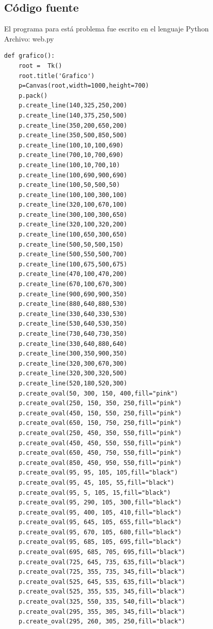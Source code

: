 \documentclass[12pt]{article}
\begin{document}
\subsection{Código fuente}
El programa para está problema fue escrito en el lenguaje Python\\

Archivo: web.py
\lstset{language=C, breaklines=true, basicstyle=\footnotesize}
\begin{lstlisting}[frame=single]
def grafico():
	root = 	Tk()
	root.title('Grafico')
	p=Canvas(root,width=1000,height=700)
	p.pack()
	p.create_line(140,325,250,200)
	p.create_line(140,375,250,500)
	p.create_line(350,200,650,200)
	p.create_line(350,500,850,500)
	p.create_line(100,10,100,690)
	p.create_line(700,10,700,690)
	p.create_line(100,10,700,10)
	p.create_line(100,690,900,690)
	p.create_line(100,50,500,50)
	p.create_line(100,100,300,100)
	p.create_line(320,100,670,100)
	p.create_line(300,100,300,650)
	p.create_line(320,100,320,200)
	p.create_line(100,650,300,650)
	p.create_line(500,50,500,150)
	p.create_line(500,550,500,700)
	p.create_line(100,675,500,675)
	p.create_line(470,100,470,200)
	p.create_line(670,100,670,300)
	p.create_line(900,690,900,350)
	p.create_line(880,640,880,530)
	p.create_line(330,640,330,530)
	p.create_line(530,640,530,350)
	p.create_line(730,640,730,350)
	p.create_line(330,640,880,640)
	p.create_line(300,350,900,350)
	p.create_line(320,300,670,300)
	p.create_line(320,300,320,500)
	p.create_line(520,180,520,300)
	p.create_oval(50, 300, 150, 400,fill="pink")
	p.create_oval(250, 150, 350, 250,fill="pink")
	p.create_oval(450, 150, 550, 250,fill="pink")
	p.create_oval(650, 150, 750, 250,fill="pink")
	p.create_oval(250, 450, 350, 550,fill="pink")
	p.create_oval(450, 450, 550, 550,fill="pink")
	p.create_oval(650, 450, 750, 550,fill="pink")
	p.create_oval(850, 450, 950, 550,fill="pink")
	p.create_oval(95, 95, 105, 105,fill="black")
	p.create_oval(95, 45, 105, 55,fill="black")
	p.create_oval(95, 5, 105, 15,fill="black")
	p.create_oval(95, 290, 105, 300,fill="black")
	p.create_oval(95, 400, 105, 410,fill="black")
	p.create_oval(95, 645, 105, 655,fill="black")
	p.create_oval(95, 670, 105, 680,fill="black")
	p.create_oval(95, 685, 105, 695,fill="black")
	p.create_oval(695, 685, 705, 695,fill="black")
	p.create_oval(725, 645, 735, 635,fill="black")
	p.create_oval(725, 355, 735, 345,fill="black")
	p.create_oval(525, 645, 535, 635,fill="black")
	p.create_oval(525, 355, 535, 345,fill="black")
	p.create_oval(325, 550, 335, 540,fill="black")
	p.create_oval(295, 355, 305, 345,fill="black")
	p.create_oval(295, 260, 305, 250,fill="black")

\end{lstlisting}
\end{document}
